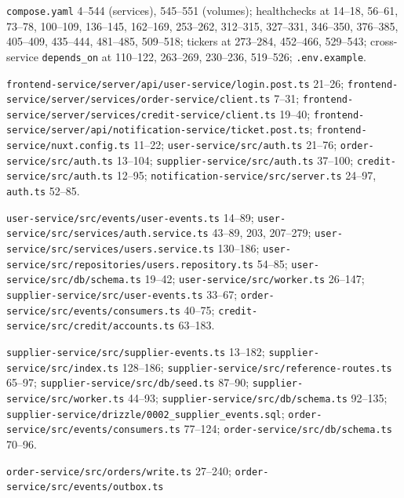 \documentclass[11pt,a4paper]{article}
\newcommand{\code}[1]{\nolinkurl{#1}}
\begin{document}
\small
\begin{description}[style=nextline, leftmargin=0pt, labelsep=0pt, itemsep=3pt]
\item[Programs, ports, databases, startup (Sections~\ref{sec:cast}, \ref{sec:compose})]
\code{compose.yaml} 4--544 (services), 545--551 (volumes); healthchecks at 14--18,
56--61, 73--78, 100--109, 136--145, 162--169, 253--262, 312--315, 327--331, 346--350, 376--385,
405--409, 435--444, 481--485, 509--518; tickers at 273--284, 452--466, 529--543;
cross-service \code{depends_on} at 110--122, 263--269, 230--236, 519--526;
\code{.env.example}.
\item[HTTP and auth (Section~\ref{sec:http})]
\code{frontend-service/server/api/user-service/login.post.ts} 21--26;
\code{frontend-service/server/services/order-service/client.ts} 7--31;
\code{frontend-service/server/services/credit-service/client.ts} 19--40;
\code{frontend-service/server/api/notification-service/ticket.post.ts};
\code{frontend-service/nuxt.config.ts} 11--22; \code{user-service/src/auth.ts} 21--76;
\code{order-service/src/auth.ts} 13--104; \code{supplier-service/src/auth.ts} 37--100;
\code{credit-service/src/auth.ts} 12--95; \code{notification-service/src/server.ts}
24--97, \code{auth.ts} 52--85.
\item[user-events (Sections~\ref{sec:topics}, \ref{sec:signup})]
\code{user-service/src/events/user-events.ts} 14--89;
\code{user-service/src/services/auth.service.ts} 43--89, 203, 207--279;
\code{user-service/src/services/users.service.ts} 130--186;
\code{user-service/src/repositories/users.repository.ts} 54--85;
\code{user-service/src/db/schema.ts} 19--42; \code{user-service/src/worker.ts} 26--147;
\code{supplier-service/src/user-events.ts} 33--67;
\code{order-service/src/events/consumers.ts} 40--75;
\code{credit-service/src/credit/accounts.ts} 63--183.
\item[supplier-events (Sections~\ref{sec:outbox}, \ref{sec:supplier})]
\code{supplier-service/src/supplier-events.ts} 13--182;
\code{supplier-service/src/index.ts} 128--186;
\code{supplier-service/src/reference-routes.ts} 65--97;
\code{supplier-service/src/db/seed.ts} 87--90; \code{supplier-service/src/worker.ts}
44--93; \code{supplier-service/src/db/schema.ts} 92--135;
\code{supplier-service/drizzle/0002_supplier_events.sql};
\code{order-service/src/events/consumers.ts} 77--124;
\code{order-service/src/db/schema.ts} 70--96.
\item[order-events and order-commands (Sections~\ref{sec:topics}, \ref{sec:order})]
\code{order-service/src/orders/write.ts} 27--240; \code{order-service/src/events/outbox.ts}

\end{description}
\end{document}
